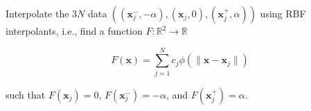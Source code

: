 Interpolate the $3N$ data $\left( (\bm{x}_j^-, -\alpha), (\bm{x}_j, 0), (\bm{x}_j^+, \alpha) \right)$ using RBF interpolants, i.e., find a function $F: \mathbb{R}^2 \to \mathbb{R}$

$$
F(\bm{x}) = \sum\limits_{j=1}^{N} c_j \phi \left( \lVert \bm{x} - \bm{x}_j \rVert \right)
$$

such that $F(\bm{x}_j) = 0$, $F(\bm{x}_j^-) = -\alpha$, and $F(\bm{x}_j^+) = \alpha$.

\begin{solution}
    \ \\
    \vfill
\end{solution}